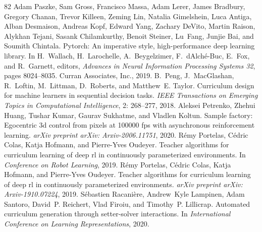 \documentclass{article}
\begin{document}
\begin{thebibliography}{82}
Adam Paszke, Sam Gross, Francisco Massa, Adam Lerer, James Bradbury, Gregory Chanan, Trevor Killeen, Zeming Lin, Natalia Gimelshein, Luca Antiga, Alban Desmaison, Andreas Kopf, Edward Yang, Zachary DeVito, Martin Raison, Alykhan Tejani, Sasank Chilamkurthy, Benoit Steiner, Lu~Fang, Junjie Bai, and Soumith Chintala.
\newblock Pytorch: An imperative style, high-performance deep learning library.
\newblock In H.~Wallach, H.~Larochelle, A.~Beygelzimer, F.~d\textquotesingle Alch\'{e}-Buc, E.~Fox, and R.~Garnett, editors, \emph{Advances in Neural Information Processing Systems 32}, pages 8024--8035. Curran Associates, Inc., 2019.
B.~Peng, J.~MacGlashan, R.~Loftin, M.~Littman, D.~Roberts, and Matthew~E. Taylor.
\newblock Curriculum design for machine learners in sequential decision tasks.
\newblock \emph{IEEE Transactions on Emerging Topics in Computational Intelligence}, 2: 268--277, 2018.
Aleksei Petrenko, Zhehui Huang, Tushar Kumar, Gaurav Sukhatme, and Vladlen Koltun.
\newblock Sample factory: Egocentric 3d control from pixels at 100000 fps with asynchronous reinforcement learning.
\newblock \emph{arXiv preprint arXiv: Arxiv-2006.11751}, 2020.
R{\'e}my Portelas, C{\'e}dric Colas, Katja Hofmann, and Pierre-Yves Oudeyer.
\newblock Teacher algorithms for curriculum learning of deep rl in continuously parameterized environments.
\newblock In \emph{Conference on Robot Learning}, 2019{}.
Rémy Portelas, Cédric Colas, Katja Hofmann, and Pierre-Yves Oudeyer.
\newblock Teacher algorithms for curriculum learning of deep rl in continuously parameterized environments.
\newblock \emph{arXiv preprint arXiv: Arxiv-1910.07224}, 2019{}.
S{\'e}bastien Racani{\`e}re, Andrew~Kyle Lampinen, Adam Santoro, David~P. Reichert, Vlad Firoiu, and Timothy~P. Lillicrap.
\newblock Automated curriculum generation through setter-solver interactions.
\newblock In \emph{International Conference on Learning Representations}, 2020.

\end{thebibliography}
\end{document}
